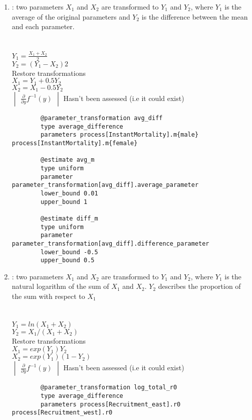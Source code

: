 \begin{enumerate}
\item {} : two parameters $X_1$ and $X_2$ are transformed to $Y_1$ and $Y_2$, where $Y_1$ is the average of the original parameters and $Y_2$ is the difference between the mean and each parameter.\\
\\
\\
$Y_1 = \frac{X_1 + X_2}{2}$\\
$Y_2 =  (Y_1 - X_2)2 $\\
Restore transformations\\
$X_1 = Y_1 + 0.5Y_2$\\
$X_2 = X_1 - 0.5Y_2$\\
$\begin{vmatrix} \frac{\partial}{\partial y} f^{-1}(y) \end{vmatrix}$ Hasn't been assessed (i.e it could exist) \\
\label{sec:Transformation-AverageDifference}
{\small{\begin{verbatim}
		@parameter_transformation avg_diff
		type average_difference
		parameters process[InstantMortality].m{male} process[InstantMortality].m{female}
		
		@estimate avg_m
		type uniform
		parameter parameter_transformation[avg_diff].average_parameter
		lower_bound 0.01
		upper_bound 1
		
		@estimate diff_m
		type uniform
		parameter parameter_transformation[avg_diff].difference_parameter
		lower_bound -0.5
		upper_bound 0.5		
\end{verbatim}}}
	
\item {} : two parameters $X_1$ and $X_2$ are transformed to $Y_1$ and $Y_2$, where $Y_1$ is the natural logarithm of the sum of $X_1$ and $X_2$. $Y_2$ describes the proportion of the sum with respect to $X_1$\\
\\
\\
$Y_1 = ln(X_1 + X_2)$\\
$Y_2 = X_1 / (X_1 + X_2)$\\
Restore transformations\\
$X_1 = exp(Y_1)Y_2$\\
$X_2 =exp(Y_1)(1 - Y_2)$\\
$\begin{vmatrix} \frac{\partial}{\partial y} f^{-1}(y) \end{vmatrix}$ Hasn't been assessed (i.e it could exist) \\
\label{sec:Transformation-LogSum}
{\small{\begin{verbatim}
		@parameter_transformation log_total_r0
		type average_difference
		parameters process[Recruitment_east].r0 process[Recruitment_west].r0
		

\end{verbatim}}}
\end{enumerate}

